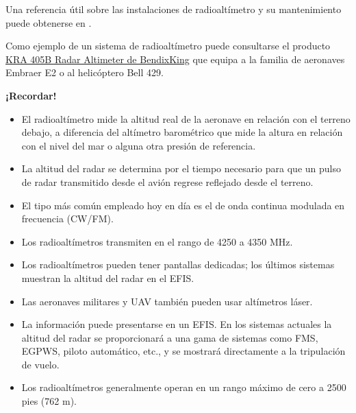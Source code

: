 Una referencia útil sobre las instalaciones de radioalt\'imetro y su mantenimiento puede obtenerse en  \protect\cite{Radioaltimetro_airbus}.

Como ejemplo de un sistema de radioalt\'imetro puede consultarse el producto \href{https://www.bendixking.com/en/products/nc/navigation-and-communication/kra-405b}{KRA 405B Radar Altimeter de BendixKing} que equipa a la familia de aeronaves Embraer E2 o al helicóptero Bell 429. 

\begin{tcolorbox} {\bf \large ¡Recordar!}{ \small
    \begin{itemize}

    \item El radioalt\'imetro mide la altitud real de la aeronave en
      relación con el terreno debajo, a diferencia del altímetro
      barom\'etrico que mide la altura en relación con el nivel del
      mar o alguna otra presi\'on de referencia.

    \item La altitud del radar se determina por el tiempo necesario
      para que un pulso de radar transmitido desde el avión regrese
      reflejado desde el terreno.

    \item El tipo m\'as com\'un empleado hoy en día es el de onda
      continua modulada en frecuencia (CW/FM).

    \item Los radioalt\'imetros transmiten en el rango de 4250 a 4350
      MHz.

    \item Los radioalt\'imetros pueden tener pantallas dedicadas; los
      últimos sistemas muestran la altitud del radar en el EFIS.

    \item Las aeronaves militares y UAV también pueden usar altímetros
      láser.

    \item La información puede presentarse en un EFIS. En los sistemas
      actuales la altitud del radar se proporcionará a una gama de
      sistemas como FMS, EGPWS, piloto automático, etc., y se mostrará
      directamente a la tripulación de vuelo.
 
    \item Los radioalt\'imetros generalmente operan en un rango máximo
      de cero a 2500 pies (762 m).

    \end{itemize}
}
  \end{tcolorbox}



